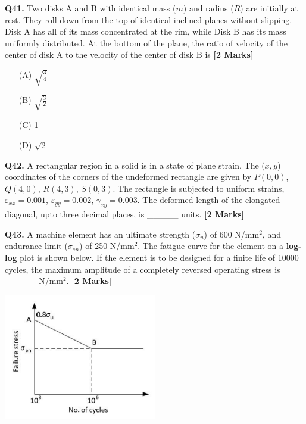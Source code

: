 \documentclass[11pt]{article}
\newcommand{\questionb}[2]{
    \noindent\textbf{Q#2.} #1 \hfill \textbf{[2 Marks]}
}
\begin{document}
\questionb{Two disks A and B with identical mass (\(m\)) and radius (\(R\)) are initially at rest. They roll down from the top of identical inclined planes without slipping. Disk A has all of its mass concentrated at the rim, while Disk B has its mass uniformly distributed. At the bottom of the plane, the ratio of velocity of the center of disk A to the velocity of the center of disk B is}{41}
\begin{enumerate}
    \item[(A)] \(\sqrt{\frac{3}{4}}\)
    \item[(B)] \(\sqrt{\frac{3}{2}}\)
    \item[(C)] 1
    \item[(D)] \(\sqrt{2}\)
\end{enumerate}
\vspace{0.5cm}

\questionb{A rectangular region in a solid is in a state of plane strain. The (\(x,y\)) coordinates of the corners of the undeformed rectangle are given by \(P(0,0)\), \(Q(4,0)\), \(R(4,3)\), \(S(0,3)\). The rectangle is subjected to uniform strains, \(\varepsilon_{xx} = 0.001\), \(\varepsilon_{yy} = 0.002\), \(\gamma_{xy} = 0.003\). The deformed length of the elongated diagonal, upto three decimal places, is \_\_\_\_\_ units.}{42}
\vspace{0.5cm}

\questionb{A machine element has an ultimate strength (\(\sigma_u\)) of 600 N/mm\(^2\), and endurance limit (\(\sigma_{en}\)) of 250 N/mm\(^2\). The fatigue curve for the element on a \textbf{log-log} plot is shown below. If the element is to be designed for a finite life of 10000 cycles, the maximum amplitude of a completely reversed operating stress is \_\_\_\_\_ N/mm\(^2\).}{43}
\begin{center}
\includegraphics[width=0.5\textwidth]{figures/43.png}
\end{center}
\vspace{0.5cm}
\end{document}
